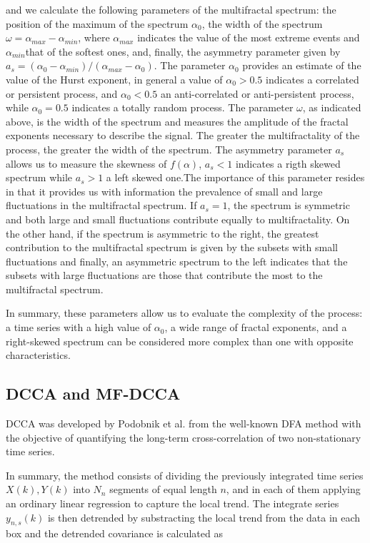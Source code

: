 \documentclass[onecolumn, preprint,aps,amsmath, amssymb, superscriptaddress]{revtex4}
\begin{document}
and we calculate the following parameters of the multifractal spectrum: the position of the maximum of the spectrum $\alpha_0$, the width of the spectrum $\omega = \alpha_{max}-\alpha_{min}$, where $\alpha_{max}$ indicates the value of the most extreme events and $\alpha_{min}$that of the softest ones, and, finally, the asymmetry parameter given by $a_s = (\alpha_0-\alpha_{min})/(\alpha_{max}-\alpha_0)$. The parameter $\alpha_0$ provides an estimate of the value of the Hurst exponent, in general a value of $\alpha_0 > 0.5$ indicates a correlated or persistent process, and $\alpha_0 < 0.5$ an anti-correlated or anti-persistent process, while $\alpha_0 = 0.5$ indicates a totally random process. The parameter $\omega$, as indicated above, is the width of the spectrum and measures the amplitude of the fractal exponents necessary to describe the signal. The greater the multifractality of the process, the greater the width of the spectrum. The asymmetry parameter $a_s$ allows us to measure the skewness of $f(\alpha)$, $a_s<1$ indicates a rigth skewed spectrum while $a_s>1$ a left skewed one.The importance of this parameter resides in that it provides us with information  the prevalence of small and large fluctuations in the multifractal spectrum. If $a_s = 1$, the spectrum is symmetric and both large and small fluctuations contribute equally to multifractality. On the other hand, if the spectrum is asymmetric to the right, the greatest contribution to the multifractal spectrum is given by the subsets with small fluctuations and finally, an asymmetric spectrum to the left indicates that the subsets with large fluctuations are those that contribute the most to the multifractal spectrum.

In summary, these parameters allow us to evaluate the complexity of the process: a time series with a high value of $\alpha_0$, a wide range of fractal exponents, and a right-skewed spectrum can be considered more complex than one with opposite characteristics.

\subsection{DCCA and MF-DCCA}

DCCA was developed by Podobnik et al. \cite{Podobnik} from the well-known DFA method \cite{Peng} with the objective of quantifying the long-term cross-correlation of two non-stationary time series. 

In summary, the method consists of dividing the previously integrated time series $X(k),Y(k)$ into $N_n$ segments of equal length $n$, and in each of them applying an ordinary linear regression to capture the local trend. 
The integrate series $y_{n,s}(k)$ is then detrended by substracting the local trend from the data in each box and the detrended covariance is calculated as
\end{document}
